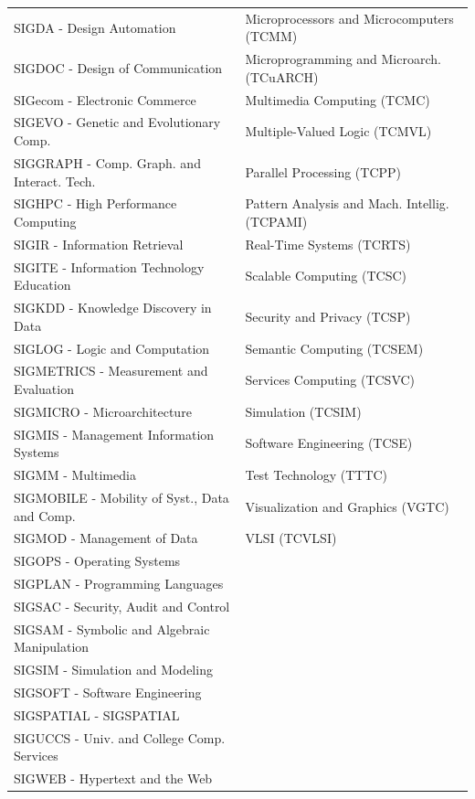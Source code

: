 \documentclass[msc]{ppgccufmg}
\begin{document}
\begin{appendices}
\begin{table}[htbp]
\begin{tabular}{ll}
SIGDA - Design Automation									&	Microprocessors and Microcomputers (TCMM)				\\
SIGDOC - Design of Communication							&	Microprogramming and Microarch. (TCuARCH)		\\
SIGecom - Electronic Commerce								&	Multimedia Computing (TCMC)								\\
SIGEVO - Genetic and Evolutionary Comp.				&	Multiple-Valued Logic (TCMVL)							\\
SIGGRAPH - Comp. Graph. and Interact. Tech.		&	Parallel Processing (TCPP)								\\
SIGHPC - High Performance Computing							&	Pattern Analysis and Mach. Intellig.(TCPAMI)		\\
SIGIR - Information Retrieval								&	Real-Time Systems (TCRTS)								\\
SIGITE - Information Technology Education					&	Scalable Computing (TCSC)								\\
SIGKDD - Knowledge Discovery in Data						&	Security and Privacy (TCSP)								\\
SIGLOG - Logic and Computation								&	Semantic Computing (TCSEM)								\\
SIGMETRICS - Measurement and Evaluation						&	Services Computing (TCSVC)								\\
SIGMICRO - Microarchitecture								&	Simulation (TCSIM)										\\	
SIGMIS - Management Information Systems						&	Software Engineering (TCSE)								\\
SIGMM - Multimedia											&	Test Technology (TTTC)									\\
SIGMOBILE - Mobility of Syst., Data and Comp.	&	Visualization and Graphics (VGTC)						\\
SIGMOD - Management of Data									&	VLSI (TCVLSI)											\\
SIGOPS - Operating Systems									&															\\
SIGPLAN - Programming Languages								&															\\
SIGSAC - Security, Audit and Control						&															\\
SIGSAM - Symbolic and Algebraic Manipulation				&															\\
SIGSIM - Simulation and Modeling							&															\\
SIGSOFT - Software Engineering								&															\\
SIGSPATIAL - SIGSPATIAL										&															\\
SIGUCCS - Univ. and College Comp. Services			&															\\
SIGWEB - Hypertext and the Web								&															\\
\bottomrule
\end{tabular}
\end{table}



\end{appendices}
\end{document}
